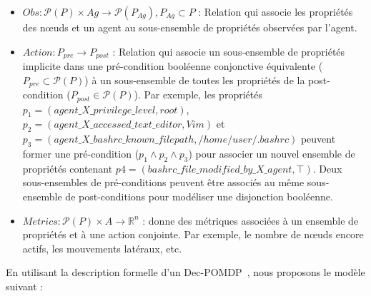 \begin{itemize}
    \item $Obs : \mathcal{P}(P) \times Ag \rightarrow \mathcal{P}(P_{Ag}), P_{Ag} \subset P$ : Relation qui associe les propriétés des nœuds et un agent au sous-ensemble de propriétés observées par l'agent.


    
    \item $Action : P_{pre} \rightarrow P_{post}$ : Relation qui associe un sous-ensemble de propriétés implicite dans une pré-condition booléenne conjonctive équivalente ($P_{pre} \subset \mathcal{P}(P)$) à un sous-ensemble de toutes les propriétés de la post-condition ($P_{post} \in \mathcal{P}(P)$). Par exemple, les propriétés $p_1 = (agent\_X\_privilege\_level, \allowbreak root)$, $p_2 = (agent\_X\_accessed\_text\_editor, \allowbreak Vim)$ et $p_3 = (agent\_X\_bashrc\_known\_filepath, \allowbreak /home/user/.bashrc)$ peuvent former une pré-condition ($p_1 \land p_2 \land p_3$) pour associer un nouvel ensemble de propriétés contenant $p4 = (bashrc\_file\_modified\_by\_X\_agent, \top)$. Deux sous-ensembles de pré-conditions peuvent être associés au même sous-ensemble de post-conditions pour modéliser une disjonction booléenne.

    \item $Metrics: \mathcal{P}(P) \times A \rightarrow \mathbb{R}^{n}$ : donne des métriques associées à un ensemble de propriétés et à une action conjointe. Par exemple, le nombre de nœuds encore actifs, les mouvements latéraux, etc.

\end{itemize}


En utilisant la description formelle d'un Dec-POMDP~\cite{OliehoekA16}, nous proposons le modèle suivant :

